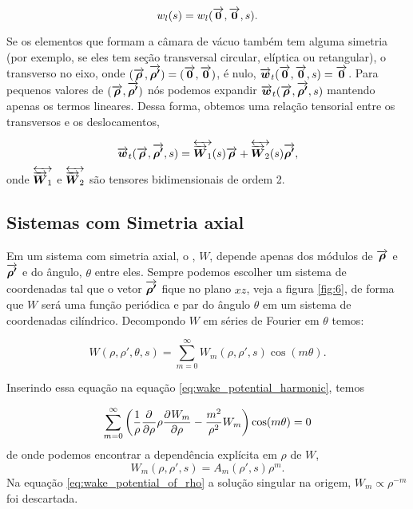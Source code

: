 \documentclass[
	12pt,				%
	openright,			%
	oneside,			%
	a4paper,		%
	chapter=TITLE,		%
	section=TITLE,		%
    brazil,				%
	english,			%
	sumario=tradicional,
	]{abntex2}
\begin{document}
\begin{equation}
	w_l(s) = w_l(\overrightarrow{\boldsymbol{0}},\overrightarrow{\boldsymbol{0}},s).
\end{equation}

Se os elementos que formam a câmara de vácuo também tem alguma simetria (por exemplo, se eles tem seção transversal circular, elíptica ou retangular), o  transverso no eixo, onde $(\overrightarrow{\boldsymbol{\rho}},\overrightarrow{\boldsymbol{\rho'}}) = (\overrightarrow{\boldsymbol{0}},\overrightarrow{\boldsymbol{0}})$, é nulo, $\overrightarrow{\boldsymbol{w}}_t(\overrightarrow{\boldsymbol{0}},\overrightarrow{\boldsymbol{0}},s)=\overrightarrow{\boldsymbol{0}}$. Para pequenos valores de $(\overrightarrow{\boldsymbol{\rho}},\overrightarrow{\boldsymbol{\rho'}})$ nós podemos expandir $\overrightarrow{\boldsymbol{w}}_t(\overrightarrow{\boldsymbol{\rho}},\overrightarrow{\boldsymbol{\rho'}},s)$ mantendo apenas os termos lineares. Dessa forma, obtemos uma relação tensorial entre os  transversos e os deslocamentos,

\begin{equation}
	\overrightarrow{\boldsymbol{w}}_t(\overrightarrow{\boldsymbol{\rho}},\overrightarrow{\boldsymbol{\rho'}},s) = \overleftrightarrow{\overrightarrow{\boldsymbol{W}}_1}(s)\overrightarrow{\boldsymbol{\rho}} +
    										 \overleftrightarrow{\overrightarrow{\boldsymbol{W}}_2}(s)\overrightarrow{\boldsymbol{\rho'}},
\end{equation}
onde $\overleftrightarrow{\overrightarrow{\boldsymbol{W}}_1}$ e $\overleftrightarrow{\overrightarrow{\boldsymbol{W}}_2}$ são tensores bidimensionais de ordem 2.

\subsection{Sistemas com Simetria axial}

Em um sistema com simetria axial, o , $W$, depende apenas dos módulos de $\overrightarrow{\boldsymbol{\rho}}$ e $\overrightarrow{\boldsymbol{\rho'}}$ e do ângulo, $\theta$ entre eles. Sempre podemos escolher um sistema de coordenadas tal que o vetor $\overrightarrow{\boldsymbol{\rho'}}$ fique no plano $xz$, veja a figura \ref{fig:6}, de forma que $W$ será uma função periódica e par  do ângulo $\theta$ em um sistema de coordenadas cilíndrico. Decompondo $W$ em séries de Fourier em $\theta$ temos:

\begin{equation}
	W(\rho,\rho',\theta,s) = \sum_{m=0}^\infty W_m (\rho,\rho',s) \cos(m\theta).
\end{equation}

Inserindo essa equação na equação \eqref{eq:wake_potential_harmonic}, temos

\begin{equation}
	\sum_{m=0}^\infty \left(\frac1\rho\frac{\partial^{{}}}{\partial \rho^{{}}}\rho\frac{\partial^{{}}W_m}{\partial \rho^{{}}} -
    					    \frac{m^2}{\rho^2}W_m\right)\cos(m\theta) = 0
\end{equation}
de onde podemos encontrar a dependência explícita em $\rho$ de $W$,
\begin{equation}\label{eq:wake_potential_of_rho}
	W_m(\rho,\rho',s) = A_m(\rho',s)\rho^m.
\end{equation}
Na equação \eqref{eq:wake_potential_of_rho} a solução singular na origem, $W_m \propto \rho^{-m}$ foi descartada.
\end{document}
